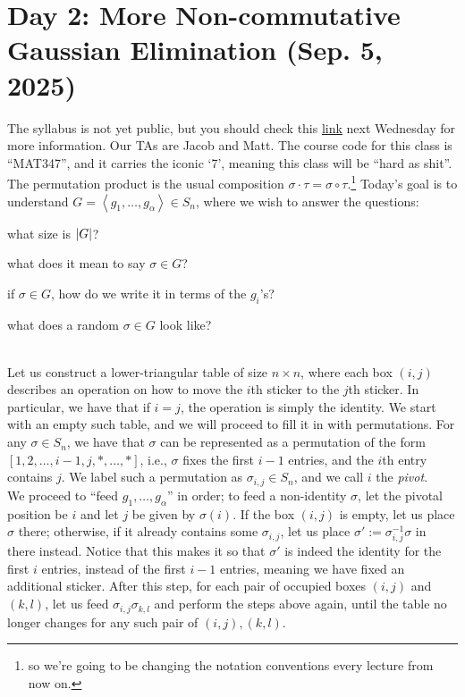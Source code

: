 \section{Day 2: More Non-commutative Gaussian Elimination (Sep. 5, 2025)}
The syllabus is not yet public, but you should check this \href{https://drorbn.net/25-347}{link} next Wednesday for more information. Our TAs are Jacob and Matt. The course code for this class is ``MAT347'', and it carries the iconic `7', meaning this class will be ``hard as shit''.
\\[8pt]
The permutation product is the usual composition $\sigma \cdot \tau = \sigma \circ \tau$.\footnote{so we're going to be changing the notation conventions every lecture from now on.} %
Today's goal is to understand $G = \left<g_1, \dots, g_\alpha\right> \in S_n$, where we wish to answer the questions: \begin{parlist} \item what size is $\left\lvert G \right\rvert$? \item what does it mean to say $\sigma \in G$? \item if $\sigma \in G$, how do we write it in terms of the $g_i$'s? \item what does a random $\sigma \in G$ look like? \end{parlist}
\\[8pt]
\noindent Let us construct a lower-triangular table of size $n \times n$, where each box $(i, j)$ describes an operation on how to move the $i$th sticker to the $j$th sticker. In particular, we have that if $i = j$, the operation is simply the identity. We start with an empty such table, and we will proceed to fill it in with permutations. For any $\sigma \in S_n$, we have that $\sigma$ can be represented as a permutation of the form $[1, 2, \dots, i-1, j, \ast, \dots, \ast]$, i.e., $\sigma$ fixes the first $i-1$ entries, and the $i$th entry contains $j$. We label such a permutation as $\sigma_{i, j} \in S_n$, and we call $i$ the \textit{pivot}.
\\[8pt]
We proceed to ``feed $g_1, \dots, g_\alpha$'' in order; to feed a non-identity $\sigma$, let the pivotal position be $i$ and let $j$ be given by $\sigma(i)$. If the box $(i, j)$ is empty, let us place $\sigma$ there; otherwise, if it already contains some $\sigma_{i, j}$, let us place $\sigma' := \sigma_{i, j}^{-1} \sigma$ in there instead. Notice that this makes it so that $\sigma'$ is indeed the identity for the first $i$ entries, instead of the first $i-1$ entries, meaning we have fixed an additional sticker. After this step, for each pair of occupied boxes $(i, j)$ and $(k, l)$, let us feed $\sigma_{i, j} \sigma_{k, l}$ and perform the steps above again, until the table no longer changes for any such pair of $(i, j), (k, l)$.
